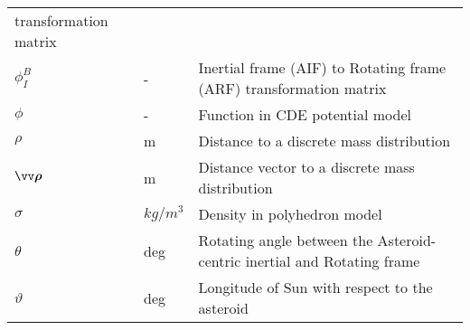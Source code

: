 \begin{longtable}[l]{p{100pt} p{70pt} p{150pt}}
                                            transformation matrix                           \\
    $\phi_{I}^{B}$      & -               & Inertial frame (AIF) to Rotating frame (ARF)
                                            transformation matrix                           \\
    $\phi$              & -               & Function in CDE potential model                 \\
    $\rho$              & m               & Distance to a discrete mass distribution        \\
    $\bvector{\rho}$    & m               & Distance vector to a discrete mass distribution \\
    $\sigma$            & $kg/m^3$        & Density in polyhedron model                     \\
    $\theta$            & deg             & Rotating angle between the Asteroid-centric
                                            inertial and Rotating frame                     \\
    $\vartheta$         & deg             & Longitude of Sun with respect to the asteroid   \\
\end{longtable}
\vspace{1cm}

